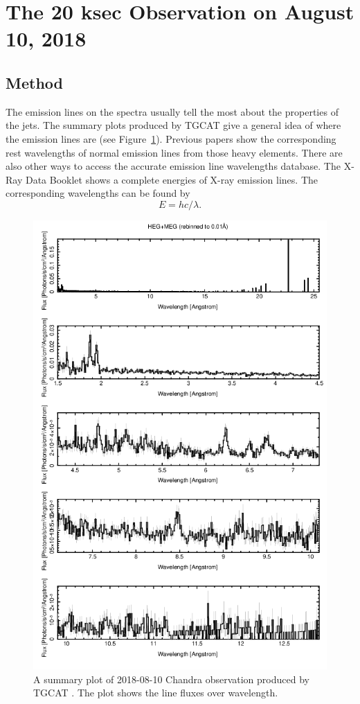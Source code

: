 \section{The 20 ksec Observation on August 10, 2018}
\subsection{Method}
The emission lines on the spectra usually tell the most about the properties of the jets. The summary plots produced by TGCAT \citep{Huenemoerder2011} give a general idea of where the emission lines are (see Figure~\ref{summaryplot_el}). Previous papers \citep{Marshall2002, Marshall2013, Lopez2006} show the corresponding rest wavelengths of normal emission lines from those heavy elements. There are also other ways to access the accurate emission line wavelengths database. The X-Ray Data Booklet \citep{thompson2001} shows a complete energies of X-ray emission lines. The corresponding wavelengths can be found by 
\begin{equation}
    E = hc/\lambda.
\end{equation}


\begin{figure}
    \centering
    \includegraphics[width = 0.7\linewidth]{Chapters/Figures/summaryplot_el.png}
    \caption{A summary plot of 2018-08-10 Chandra observation produced by TGCAT \citep{Huenemoerder2011}. The plot shows the line fluxes over wavelength. }
    \label{summaryplot_el}
\end{figure}

